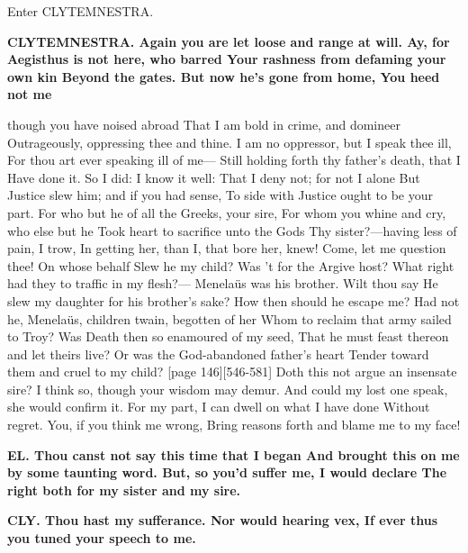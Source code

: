 \documentclass[11pt,letter]{book}
\begin{document}
\par  Enter CLYTEMNESTRA.

\par \textbf{CLYTEMNESTRA. Again you are let loose and range at will. Ay, for Aegisthus is not here, who barred Your rashness from defaming your own kin Beyond the gates. But now he’s gone from home, You heed not me}
\par   though you have noised abroad That I am bold in crime, and domineer Outrageously, oppressing thee and thine. I am no oppressor, but I speak thee ill, For thou art ever speaking ill of me— Still holding forth thy father’s death, that I Have done it. So I did:  I know it well:  That I deny not; for not I alone But Justice slew him; and if you had sense, To side with Justice ought to be your part. For who but he of all the Greeks, your sire, For whom you whine and cry, who else but he Took heart to sacrifice unto the Gods Thy sister?—having less of pain, I trow, In getting her, than I, that bore her, knew! Come, let me question thee! On whose behalf Slew he my child? Was ’t for the Argive host? What right had they to traffic in my flesh?— Menelaüs was his brother. Wilt thou say He slew my daughter for his brother’s sake? How then should he escape me? Had not he, Menelaüs, children twain, begotten of her Whom to reclaim that army sailed to Troy? Was Death then so enamoured of my seed, That he must feast thereon and let theirs live? Or was the God-abandoned father’s heart Tender toward them and cruel to my child? [page 146][546-581] Doth this not argue an insensate sire? I think so, though your wisdom may demur. And could my lost one speak, she would confirm it. For my part, I can dwell on what I have done Without regret. You, if you think me wrong, Bring reasons forth and blame me to my face!

\par \textbf{EL. Thou canst not say this time that I began And brought this on me by some taunting word. But, so you’d suffer me, I would declare The right both for my sister and my sire.}
\par 

\par \textbf{CLY. Thou hast my sufferance. Nor would hearing vex, If ever thus you tuned your speech to me.}
\par 
\end{document}
